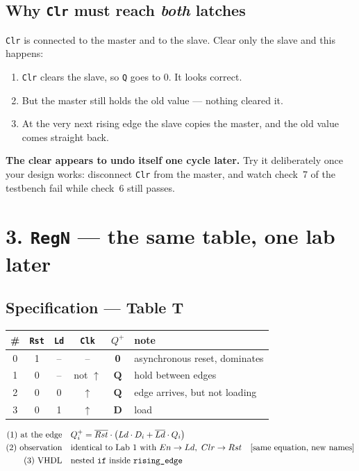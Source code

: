 \documentclass[11pt]{article}
\newcommand{\code}[1]{\texttt{#1}}
\begin{document}
\subsection*{Why \code{Clr} must reach \emph{both} latches}

\code{Clr} is connected to the master and to the slave. Clear only the slave and
this happens:

\begin{enumerate}[leftmargin=2em,itemsep=1pt]
\item \code{Clr} clears the slave, so \code{Q} goes to 0. It looks correct.
\item But the master still holds the old value --- nothing cleared it.
\item At the very next rising edge the slave copies the master, and the old value
comes straight back.
\end{enumerate}

\textbf{The clear appears to undo itself one cycle later.} Try it deliberately
once your design works: disconnect \code{Clr} from the master, and watch check~7
of the testbench fail while check~6 still passes.

\section*{3. \code{RegN} --- the same table, one lab later}

\subsection*{Specification --- Table T}

\begin{center}
\begin{tabular}{c|ccc|c|l}
\toprule
\# & \code{Rst} & \code{Ld} & \code{Clk} & $Q^{+}$ & note \\
\midrule
0 & 1 & -- & -- & \textbf{0} & asynchronous reset, dominates \\
1 & 0 & -- & not $\uparrow$ & $\mathbf{Q}$ & hold between edges \\
2 & 0 & 0 & $\uparrow$ & $\mathbf{Q}$ & edge arrives, but not loading \\
3 & 0 & 1 & $\uparrow$ & $\mathbf{D}$ & load \\
\bottomrule
\end{tabular}
\end{center}

\begin{align*}
\text{(1) at the edge} \quad & Q_i^{+} = \overline{Rst}\cdot\left( Ld\cdot D_i + \overline{Ld}\cdot Q_i \right)\\
\text{(2) observation} \quad & \text{identical to Lab 1 with } En \to Ld,\ Clr \to Rst
   \quad\text{[same equation, new names]}\\
\text{(3) VHDL} \quad & \text{nested \code{if} inside \code{rising\_edge}}
\end{align*}
\end{document}
